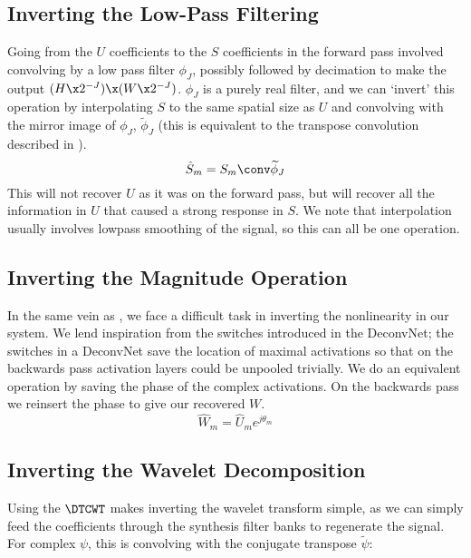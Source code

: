 \subsection{Inverting the Low-Pass Filtering}
Going from the $U$ coefficients to the $S$ coefficients in the forward pass involved convolving by
a low pass filter $\phi_J$, possibly followed by decimation to make the output $(H\x
2^{-J})\x (W\x2^{-J})$.  $\phi_J$ is a purely real filter, and we can `invert'
this operation by interpolating $S$ to the same spatial size as $U$ and convolving with
the mirror image of $\phi_J$, $\widetilde{\phi}_J$ (this is equivalent to the
transpose convolution described in \cite{zeiler_visualizing_2014}). 
\begin{equation}
  \label{eq:ch4:s_hat}
  \hat{S}_{m} = S_{m} \conv \widetilde{\phi}_J
\end{equation}
This will not recover $U$ as it was on the forward pass, but will recover all
the information in $U$ that caused a strong response in $S$. We note that
interpolation usually involves lowpass smoothing of the signal, so this can all
be one operation.

\subsection{Inverting the Magnitude Operation}
In the same vein as \cite{zeiler_visualizing_2014}, we face a difficult
task in inverting the nonlinearity in our system. 
We lend inspiration from the switches introduced in the DeconvNet; the
switches in a DeconvNet save the location of maximal activations so that
on the backwards pass activation layers could be unpooled trivially. We do an
equivalent operation by saving the phase of the complex activations. On the
backwards pass we reinsert the phase to give our recovered $W$. 
\begin{equation}
  \label{eq:ch4:w_hat}
  \hat{W}_{m} = \hat{U}_{m}e^{j\theta_{m}}
\end{equation}

\subsection{Inverting the Wavelet Decomposition}
Using the $\DTCWT$ makes inverting the wavelet transform simple, as we
can simply feed the coefficients through the synthesis filter banks to regenerate
the signal. For complex $\psi$, this is convolving with the conjugate transpose
$\widetilde{\psi}$: 

